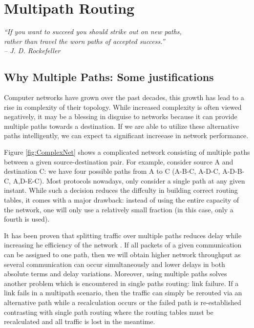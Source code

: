 \chapter{Multipath Routing}
\begin{flushright}
 \textit{\textquotedblleft If you want to succeed you should strike out on new paths, \\ 
rather than travel the worn paths of accepted success.\textquotedblright}\\
\textit{-- J. D. Rockefeller}
\end{flushright}
\label{chap:multipath}

\ifpdf
    \graphicspath{{3-MultipathRouting/Chapter2Figs/PNG/}{3-MultipathRouting/Chapter2Figs/PDF/}{3-MultipathRouting/Chapter2Figs/}}
\else
    \graphicspath{{3-MultipathRouting/Chapter2Figs/EPS/}{3-MultipathRouting/Chapter2Figs/}}
\fi

\section{Why Multiple Paths: Some justifications}

Computer networks have grown over the past decades, this growth has lead to a rise in complexity of their topology. While increased complexity is often viewed negatively, it may be a blessing in disguise to networks because it can provide multiple paths towards a destination. If we are able to utilize these alternative paths intelligently, we can expect ta significant increease in network performance.


Figure \ref{fig:ComplexNet} shows a complicated network consisting of multiple paths between a given source-destination pair. For example, consider source A and destination C: we have four possible paths from A to C (A-B-C, A-D-C, A-D-B-C, A,D-E-C). Most protocols nowadays, only consider a single path at any given instant. While such a decision reduces the diffculty in building correct routing tables, it comes with a major drawback: instead of using the entire capacity of the network, one will only use a relatively small fraction (in this case, only a fourth is used).

It has been proven that splitting traffic over multiple paths reduces delay while increasing he efficiency of the network \cite{ParaQueue, Huitema}. If all packets of a given communication can be assigned to one path, then we will obtain higher network throughput as several communication can occur simultaneously and lower delays in both absolute terms and delay variations. Moreover, using multiple paths solves another problem which is encountered in single paths routing: link failure. If a link fails in a multipath scenario, then the traffic can simply be rerouted via an alternative path while a recalculation occurs or the failed path is re-established contrasting with single path routing where the routing tables must be recalculated and all traffic is lost in the meantime. 

